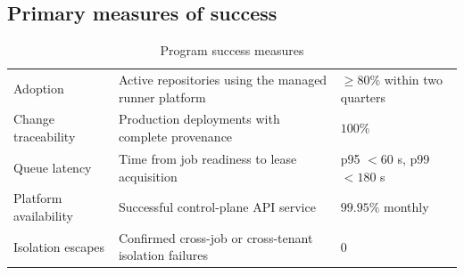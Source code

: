 \subsection{Primary measures of success}

\begin{table}[htbp]
\centering
\caption{Program success measures}
\label{tab:success-measures}
\begin{tabularx}{\textwidth}{@{}L{0.28\textwidth}Y L{0.23\textwidth}@{}}
  \toprule
   &  &  \\
  \midrule
  Adoption & Active repositories using the managed runner platform & $\geq 80\%$ within two quarters \\
  Change traceability & Production deployments with complete provenance & $100\%$ \\
  Queue latency & Time from job readiness to lease acquisition & p95 $<60$ s, p99 $<180$ s \\
  Platform availability & Successful control-plane API service & $99.95\%$ monthly \\
  Isolation escapes & Confirmed cross-job or cross-tenant isolation failures & 0 \\
  \bottomrule
\end{tabularx}
\end{table}

